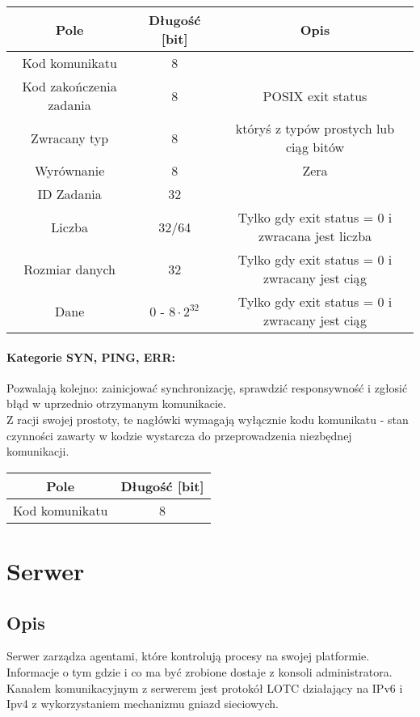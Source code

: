 \documentclass[10pt,a4paper]{article}
\begin{document}
            \begin{tabular}{ c | c | c }
			    \textbf{Pole} & \textbf{Długość [bit]} & \textbf{Opis} \\
			    \hline
			    Kod komunikatu & 8 & \\
			    Kod zakończenia zadania & 8 & POSIX exit status \\
			    Zwracany typ & 8 & któryś z typów prostych lub ciąg bitów \\
			    Wyrównanie & 8 & Zera \\
			    ID Zadania & 32 & \\
			    Liczba & 32/64 & Tylko gdy exit status = 0 i zwracana jest liczba \\
			    Rozmiar danych & 32 & Tylko gdy exit status = 0 i zwracany jest ciąg \\
			    Dane & 0 - $ 8 \cdot 2^{32} $ & Tylko gdy exit status = 0 i zwracany jest ciąg \\
			\end{tabular}
			
			\paragraph{Kategorie SYN, PING, ERR:\\}
            Pozwalają kolejno: zainicjować synchronizację, sprawdzić responsywność i zgłosić błąd w uprzednio otrzymanym komunikacie. \\
            Z racji swojej prostoty, te nagłówki wymagają wyłącznie kodu komunikatu - stan czynności zawarty w kodzie wystarcza do przeprowadzenia niezbędnej komunikacji.
            
            \begin{tabular}{ c | c  }
			    \textbf{Pole} & \textbf{Długość [bit]} \\
			    \hline
			    Kod komunikatu & 8 \\
			\end{tabular}
    
    \section{Serwer}
			
		\subsection{Opis}
			Serwer zarządza agentami, które kontrolują procesy na swojej platformie. Informacje o tym gdzie i co ma być zrobione dostaje z konsoli administratora. Kanałem komunikacyjnym z serwerem jest protokół LOTC działający na IPv6 i Ipv4 z wykorzystaniem mechanizmu gniazd sieciowych. \\
		
\end{document}
